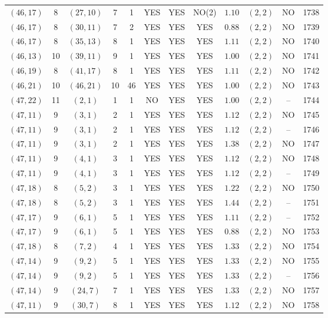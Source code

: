 \begin{longtable}{|c|c|c|c|c|c|c|c|c|c|c|c|}
$(46,17)$ & 8 & $(27,10)$ & 7 & 1 & YES & YES & NO(2) & $1.10$ & $(2,2)$ & NO & 1738\\
$(46,17)$ & 8 & $(30,11)$ & 7 & 2 & YES & YES & YES & $0.88$ & $(2,2)$ & NO & 1739\\
$(46,17)$ & 8 & $(35,13)$ & 8 & 1 & YES & YES & YES & $1.11$ & $(2,2)$ & NO & 1740\\
$(46,13)$ & 10 & $(39,11)$ & 9 & 1 & YES & YES & YES & $1.00$ & $(2,2)$ & NO & 1741\\
$(46,19)$ & 8 & $(41,17)$ & 8 & 1 & YES & YES & YES & $1.11$ & $(2,2)$ & NO & 1742\\
$(46,21)$ & 10 & $(46,21)$ & 10 & 46 & YES & YES & YES & $1.00$ & $(2,2)$ & NO & 1743\\
$(47,22)$ & 11 & $(2,1)$ & 1 & 1 & NO & YES & YES & $1.00$ & $(2,2)$ & -- & 1744\\
$(47,11)$ & 9 & $(3,1)$ & 2 & 1 & YES & YES & YES & $1.12$ & $(2,2)$ & NO & 1745\\
$(47,11)$ & 9 & $(3,1)$ & 2 & 1 & YES & YES & YES & $1.12$ & $(2,2)$ & -- & 1746\\
$(47,11)$ & 9 & $(3,1)$ & 2 & 1 & YES & YES & YES & $1.38$ & $(2,2)$ & NO & 1747\\
$(47,11)$ & 9 & $(4,1)$ & 3 & 1 & YES & YES & YES & $1.12$ & $(2,2)$ & NO & 1748\\
$(47,11)$ & 9 & $(4,1)$ & 3 & 1 & YES & YES & YES & $1.12$ & $(2,2)$ & -- & 1749\\
$(47,18)$ & 8 & $(5,2)$ & 3 & 1 & YES & YES & YES & $1.22$ & $(2,2)$ & NO & 1750\\
$(47,18)$ & 8 & $(5,2)$ & 3 & 1 & YES & YES & YES & $1.44$ & $(2,2)$ & -- & 1751\\
$(47,17)$ & 9 & $(6,1)$ & 5 & 1 & YES & YES & YES & $1.11$ & $(2,2)$ & -- & 1752\\
$(47,17)$ & 9 & $(6,1)$ & 5 & 1 & YES & YES & YES & $0.88$ & $(2,2)$ & NO & 1753\\
$(47,18)$ & 8 & $(7,2)$ & 4 & 1 & YES & YES & YES & $1.33$ & $(2,2)$ & NO & 1754\\
$(47,14)$ & 9 & $(9,2)$ & 5 & 1 & YES & YES & YES & $1.33$ & $(2,2)$ & NO & 1755\\
$(47,14)$ & 9 & $(9,2)$ & 5 & 1 & YES & YES & YES & $1.33$ & $(2,2)$ & -- & 1756\\
$(47,14)$ & 9 & $(24,7)$ & 7 & 1 & YES & YES & YES & $1.33$ & $(2,2)$ & NO & 1757\\
$(47,11)$ & 9 & $(30,7)$ & 8 & 1 & YES & YES & YES & $1.12$ & $(2,2)$ & NO & 1758\\

\end{longtable}
